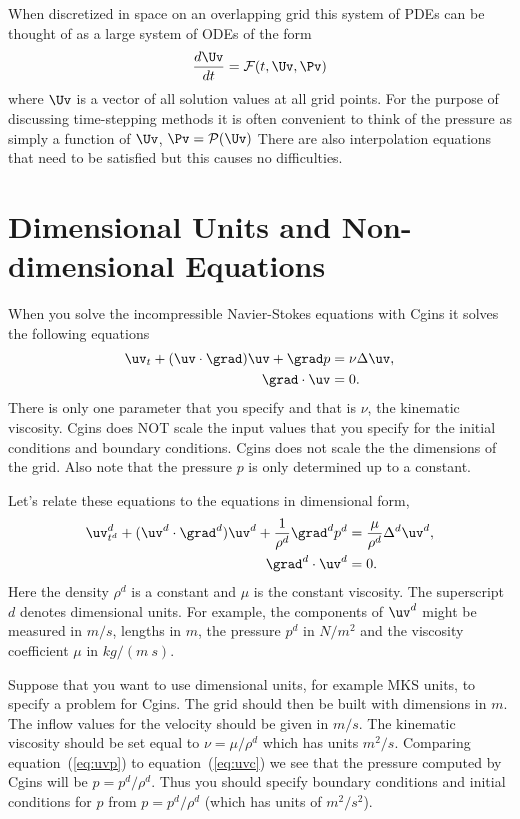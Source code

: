\documentclass[12pt]{article}
\begin{document}
\def\Ps {{\cal P}}
When discretized in space on an overlapping grid this system of PDEs
can be thought of as a large system of ODEs of the form
$$
    {d \Uv \over dt} = \Fs(t,\Uv,\Pv)
$$
where $\Uv$ is a vector of all solution values at all grid points.
For the purpose of discussing time-stepping methods it is often
convenient to think of the pressure as simply a function of $\Uv$,
$\Pv=\Ps(\Uv)$
There are also interpolation equations that need to be satisfied but
this causes no difficulties.

\clearpage
\section{Dimensional Units and Non-dimensional Equations}


When you solve the incompressible Navier-Stokes equations with Cgins
it solves the following equations
\begin{align}
   \uv_t + (\uv\cdot\grad)\uv + \grad p &= \nu \Delta \uv, \label{eq:uvc} \\
   \grad\cdot\uv &= 0.
\end{align}
There is only one parameter that you specify and that is $\nu$, the kinematic 
viscosity. Cgins does NOT scale the input values that you specify for
the initial conditions and boundary conditions. Cgins does not scale the
the dimensions of the grid.
Also note that the pressure $p$ is only determined up to a constant. 

\newcommand{\tp}{t^d}
\newcommand{\xvp}{\xv^d}
\newcommand{\uvp}{\uv^d}
\newcommand{\pp}{p^d}
\newcommand{\rhop}{\rho^d}
\newcommand{\Deltap}{\Delta^d}
\newcommand{\gradp}{\grad^d}

Let's relate these equations to the equations in dimensional form,
\begin{align}
   \uvp_{\tp} + (\uvp\cdot\gradp)\uvp + {1\over\rhop} \gradp \pp &= \frac{\mu}{\rhop} \Deltap \uvp, 
                          \label{eq:uvp}\\
   \gradp\cdot\uvp &= 0.
\end{align}
Here the density $\rhop$ is
a constant and $\mu$ is the constant viscosity.
The superscript $d$ denotes dimensional units. For example, the components of  $\uvp$ might be
measured in $m/s$, lengths in $m$, the pressure $\pp$ in $N/m^2$ and the viscosity coefficient
$\mu$ in $kg/(m~s)$.  

Suppose that you want to use dimensional units, for example MKS units, to specify a problem for Cgins.
The grid should then be built with dimensions in $m$. The inflow values
for the velocity should be given in $m/s$. The kinematic viscosity should be
set equal to $\nu=\mu/\rhop$ which has units $m^2/s$. 
Comparing equation~(\ref{eq:uvp}) to equation~(\ref{eq:uvc})
we see that the pressure computed by Cgins will be $p=\pp/\rhop$. Thus you should
specify boundary conditions and initial conditions for $p$ from $p=\pp/\rhop$ (which has
units of $m^2/s^2$). 
\end{document}
